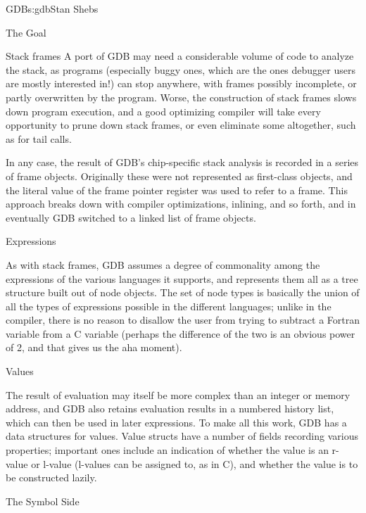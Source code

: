 \begin{aosachapter}{GDB}{s:gdb}{Stan Shebs}
\begin{aosasect1}{The Goal}
\begin{aosasect1}{Stack frames}
A port of GDB may need a considerable volume of code to analyze the
stack, as programs (especially buggy ones, which are the ones debugger
users are mostly interested in!) can stop anywhere, with frames
possibly incomplete, or partly overwritten by the program.  Worse, the
construction of stack frames slows down program execution, and a good
optimizing compiler will take every opportunity to prune down stack
frames, or even eliminate some altogether, such as for tail calls.

In any case, the result of GDB's chip-specific stack analysis is
recorded in a series of frame objects.  Originally these were not
represented as first-class objects, and the literal value of the frame
pointer register was used to refer to a frame.  This approach breaks
down with compiler optimizations, inlining, and so forth, and in
eventually GDB switched to a linked list of frame objects.

\end{aosasect1}

\begin{aosasect1}{Expressions}

As with stack frames, GDB assumes a degree of commonality among the
expressions of the various languages it supports, and represents them
all as a tree structure built out of node objects.  The set of node
types is basically the union of all the types of expressions possible
in the different languages; unlike in the compiler, there is no reason
to disallow the user from trying to subtract a Fortran variable from a
C variable (perhaps the difference of the two is an obvious power of
2, and that gives us the aha moment).

\end{aosasect1}

\begin{aosasect1}{Values}

The result of evaluation may itself be more complex than an integer or
memory address, and GDB also retains evaluation results in a numbered history
list, which can then be used in later expressions.  To make all this work,
GDB has a data structures for values.  Value structs have a number of fields
recording various properties; important ones include an indication of whether
the value is an r-value or l-value (l-values can be assigned to, as in C),
and whether the value is to be constructed lazily.

\end{aosasect1}

\begin{aosasect1}{The Symbol Side}


\end{aosasect1}
\end{aosasect1}
\end{aosachapter}
